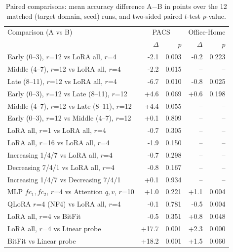 \begin{table}[t]
\centering\small
\begin{tabular}{lrrrr}
\toprule
Comparison (A vs B) & \multicolumn{2}{c}{PACS} & \multicolumn{2}{c}{Office-Home} \\
 & $\Delta$ & $p$ & $\Delta$ & $p$ \\
\midrule
Early (0--3), $r$=12 vs LoRA all, $r$=4 & -2.1 & 0.003 & -0.2 & 0.223 \\
Middle (4--7), $r$=12 vs LoRA all, $r$=4 & -2.2 & 0.015 & -- & -- \\
Late (8--11), $r$=12 vs LoRA all, $r$=4 & -6.7 & 0.010 & -0.8 & 0.025 \\
Early (0--3), $r$=12 vs Late (8--11), $r$=12 & +4.6 & 0.069 & +0.6 & 0.198 \\
Middle (4--7), $r$=12 vs Late (8--11), $r$=12 & +4.4 & 0.055 & -- & -- \\
Early (0--3), $r$=12 vs Middle (4--7), $r$=12 & +0.1 & 0.809 & -- & -- \\
LoRA all, $r$=1 vs LoRA all, $r$=4 & -0.7 & 0.305 & -- & -- \\
LoRA all, $r$=16 vs LoRA all, $r$=4 & -1.9 & 0.150 & -- & -- \\
Increasing 1/4/7 vs LoRA all, $r$=4 & -0.7 & 0.298 & -- & -- \\
Decreasing 7/4/1 vs LoRA all, $r$=4 & -0.8 & 0.167 & -- & -- \\
Increasing 1/4/7 vs Decreasing 7/4/1 & +0.1 & 0.934 & -- & -- \\
MLP $fc_1,fc_2$, $r$=4 vs Attention $q,v$, $r$=10 & +1.0 & 0.221 & +1.1 & 0.004 \\
QLoRA $r$=4 (NF4) vs LoRA all, $r$=4 & -0.1 & 0.781 & -0.5 & 0.004 \\
LoRA all, $r$=4 vs BitFit & -0.5 & 0.351 & +0.8 & 0.048 \\
LoRA all, $r$=4 vs Linear probe & +17.7 & 0.001 & +2.3 & 0.000 \\
BitFit vs Linear probe & +18.2 & 0.001 & +1.5 & 0.060 \\
\bottomrule
\end{tabular}
\caption{Paired comparisons: mean accuracy difference A$-$B in points over the 12 matched (target domain, seed) runs, and two-sided paired $t$-test $p$-value.}
\label{tab:tests}
\end{table}
